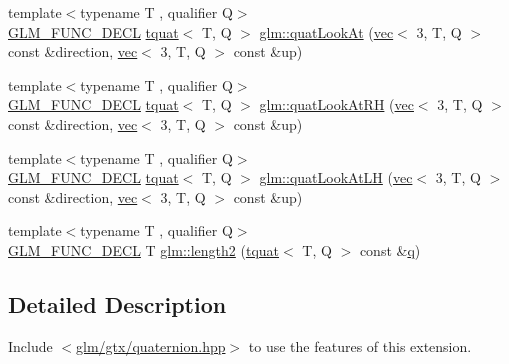 \begin{DoxyCompactItemize}
\item 
{\footnotesize template$<$typename T , qualifier Q$>$ }\\\mbox{\hyperlink{setup_8hpp_ab2d052de21a70539923e9bcbf6e83a51}{G\+L\+M\+\_\+\+F\+U\+N\+C\+\_\+\+D\+E\+CL}} \mbox{\hyperlink{structglm_1_1tquat}{tquat}}$<$ T, Q $>$ \mbox{\hyperlink{group__gtx__quaternion_ga668d9ec9964ced2b455d416677e1e8b9}{glm\+::quat\+Look\+At}} (\mbox{\hyperlink{structglm_1_1vec}{vec}}$<$ 3, T, Q $>$ const \&direction, \mbox{\hyperlink{structglm_1_1vec}{vec}}$<$ 3, T, Q $>$ const \&up)
\item 
{\footnotesize template$<$typename T , qualifier Q$>$ }\\\mbox{\hyperlink{setup_8hpp_ab2d052de21a70539923e9bcbf6e83a51}{G\+L\+M\+\_\+\+F\+U\+N\+C\+\_\+\+D\+E\+CL}} \mbox{\hyperlink{structglm_1_1tquat}{tquat}}$<$ T, Q $>$ \mbox{\hyperlink{group__gtx__quaternion_gad30cbeb78315773b6d18d9d1c1c75b77}{glm\+::quat\+Look\+At\+RH}} (\mbox{\hyperlink{structglm_1_1vec}{vec}}$<$ 3, T, Q $>$ const \&direction, \mbox{\hyperlink{structglm_1_1vec}{vec}}$<$ 3, T, Q $>$ const \&up)
\item 
{\footnotesize template$<$typename T , qualifier Q$>$ }\\\mbox{\hyperlink{setup_8hpp_ab2d052de21a70539923e9bcbf6e83a51}{G\+L\+M\+\_\+\+F\+U\+N\+C\+\_\+\+D\+E\+CL}} \mbox{\hyperlink{structglm_1_1tquat}{tquat}}$<$ T, Q $>$ \mbox{\hyperlink{group__gtx__quaternion_ga6f1b3fba52fcab952d0ab523177ff443}{glm\+::quat\+Look\+At\+LH}} (\mbox{\hyperlink{structglm_1_1vec}{vec}}$<$ 3, T, Q $>$ const \&direction, \mbox{\hyperlink{structglm_1_1vec}{vec}}$<$ 3, T, Q $>$ const \&up)
\item 
{\footnotesize template$<$typename T , qualifier Q$>$ }\\\mbox{\hyperlink{setup_8hpp_ab2d052de21a70539923e9bcbf6e83a51}{G\+L\+M\+\_\+\+F\+U\+N\+C\+\_\+\+D\+E\+CL}} T \mbox{\hyperlink{group__gtx__quaternion_ga229bacc3051770b030042fe266f7b0cb}{glm\+::length2}} (\mbox{\hyperlink{structglm_1_1tquat}{tquat}}$<$ T, Q $>$ const \&\mbox{\hyperlink{_s_d_l__opengl_8h_a8fc1e7b9baaae687804c7eed46ca09c6}{q}})
\end{DoxyCompactItemize}


\subsection{Detailed Description}
Include $<$\mbox{\hyperlink{gtx_2quaternion_8hpp}{glm/gtx/quaternion.\+hpp}}$>$ to use the features of this extension.

